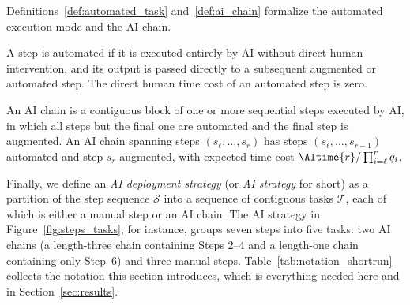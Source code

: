 Definitions~\ref{def:automated_task} and~\ref{def:ai_chain} formalize the automated execution mode and the AI chain.

\begin{definition}
\label{def:automated_task}
A step is automated if it is executed entirely by AI without direct human intervention, and its output is passed directly to a subsequent augmented or automated step.
The direct human time cost of an automated step is zero.
\end{definition}

\begin{definition}[AI Chain]
\label{def:ai_chain}
An AI chain is a contiguous block of one or more sequential steps executed by AI, in which all steps but the final one are automated and the final step is augmented.
An AI chain spanning steps $(s_\ell,\dots,s_r)$ has steps $(s_\ell,\dots,s_{r-1})$ automated and step $s_r$ augmented, with expected time cost $\AItime{r}/\prod_{i=\ell}^{r} q_i$.
\end{definition}

Finally, we define an \emph{AI deployment strategy} (or \emph{AI strategy} for short) as a partition of the step sequence $\mathcal{S}$ into a sequence of contiguous tasks $\mathcal{T}$, each of which is either a manual step or an AI chain.
The AI strategy in Figure~\ref{fig:steps_tasks}, for instance, groups seven steps into five tasks: two AI chains (a length-three chain containing Steps 2--4 and a length-one chain containing only Step~6) and three manual steps.
Table~\ref{tab:notation_shortrun} collects the notation this section introduces, which is everything needed here and in Section~\ref{sec:results}.

